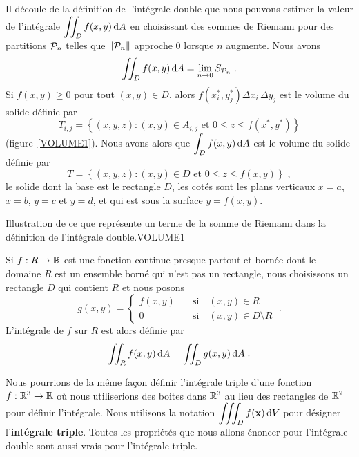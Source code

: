 {Il découle de la définition de l'intégrale double que nous pouvons
estimer la valeur de l'intégrale
$\displaystyle \iint_D f(x,y) \,\mathrm{d}A$ en choisissant
des sommes de Riemann pour des partitions ${\cal P}_n$ telles que
$\|{\cal P}_n\|$ approche $0$ lorsque $n$ augmente.  Nous avons
\begin{equation}\label{defDI_int_cpm}
\iint_D f(x,y) \,\mathrm{d}A = \lim_{n\rightarrow 0}  S_{{\cal P}_n} \; .
\end{equation}
Si $f(x,y) \geq 0$ pour tout $(x,y) \in D$, alors
$f\left(x_i^\ast,y_j^\ast\right) \Delta x_i \, \Delta y_j$ est
le volume du solide définie par
\[
T_{i,j} = \left\{ (x,y,z) : (x,y) \in A_{i,j} \text{ et }
0 \leq z \leq f(x^\ast,y^\ast) \right\}
\]
(figure~\ref{VOLUME1}).
Nous avons alors que $\displaystyle \int_D f(x,y) \,\mathrm{d}A$ est le volume du
solide définie par
\[
T = \left\{ (x,y,z) : (x,y) \in D \text{ et } 0 \leq z \leq f(x,y)
\right\} \; ,
\]
le solide dont la base est le rectangle $D$, les cotés sont les plans
verticaux $x=a$, $x=b$, $y=c$ et $y=d$, et qui est sous la surface
$y=f(x,y)$.

 {Illustration
de ce que représente un terme de la somme de Riemann dans la définition de
l'intégrale double.}{VOLUME1}

\begin{defn}
Si $f:R\rightarrow \mathbb{R}$ est une fonction continue presque partout et
bornée dont le domaine $R$ est un ensemble borné qui n'est pas un
rectangle, nous choisissons un rectangle $D$ qui contient $R$ et nous
posons
\[
g(x,y) = \begin{cases} f(x,y) & \quad \text{si} \quad (x,y) \in R \\
0 & \quad \text{si} \quad (x,y) \in D\setminus R
\end{cases} \; .
\]
L'intégrale de $f$ sur $R$ est alors définie par
\[
\iint_R f(x,y) \,\mathrm{d}A = \iint_D g(x,y) \,\mathrm{d}A \; .
\]
\end{defn}

Nous pourrions de la même façon définir l'intégrale triple d'une fonction
$f:\mathbb{R}^3 \to \mathbb{R}$ où nous utiliserions des boites dans $\mathbb{R}^3$ au lieu
des rectangles de $\mathbb{R}^2$ pour définir l'intégrale.  Nous utilisons la
notation $\displaystyle \iiint_D f(\mathbf{x}) \,\mathrm{d}V$ pour
désigner l'{\bfseries intégrale triple}.
Toutes les propriétés que nous allons énoncer pour l'intégrale double
sont aussi vrais pour l'intégrale triple.

}
